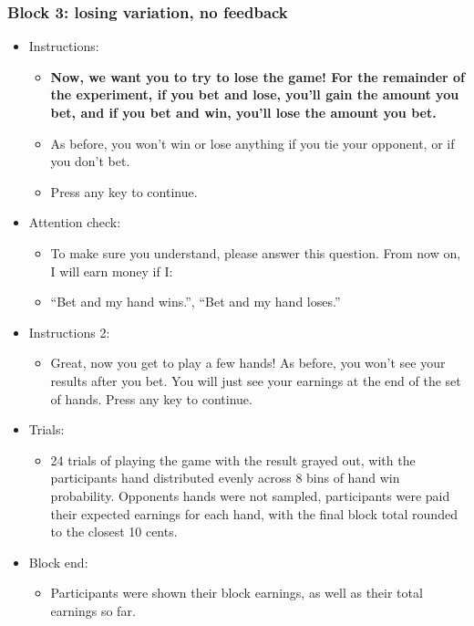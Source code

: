 \subsubsection{Block 3: losing variation, no feedback}
\begin{itemize}
\item Instructions:
    \begin{itemize}
    \item \textbf{\color{red} Now, we want you to try to lose the game! For the remainder of the experiment, if you bet and lose, you'll gain the amount you bet, and if you bet and win, you'll lose the amount you bet.}
    \item As before, you won't win or lose anything if you tie your opponent, or if you don't bet.
    \item Press any key to continue.
    \end{itemize}
\item Attention check:
    \begin{itemize}
    \item To make sure you understand, please answer this question. From now on, I will earn money if I:
    \item ``Bet and my hand wins.'', ``Bet and my hand loses.'' 
    \end{itemize}
\item Instructions 2:
    \begin{itemize}
    \item Great, now you get to play a few hands! As before, you won't see your results after you bet. You will just see your earnings at the end of the set of hands. Press any key to continue.
    \end{itemize}
\item Trials:
    \begin{itemize}
    \item 24 trials of playing the game with the result grayed out, with the participants hand distributed evenly across 8 bins of hand win probability. Opponents hands were not sampled, participants were paid their expected earnings for each hand, with the final block total rounded to the closest 10 cents. 
    \end{itemize}
\item Block end:
    \begin{itemize}
    \item Participants were shown their block earnings, as well as their total earnings so far.
    \end{itemize}
\end{itemize}

